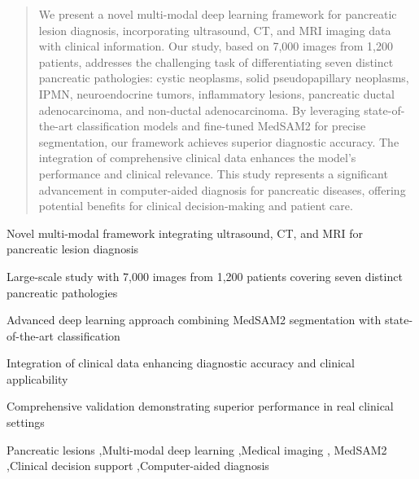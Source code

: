\documentclass[a4paper, fleqn]{cas-dc}
\begin{document}
    \begin{abstract}
        We present a novel multi-modal deep learning framework for pancreatic lesion
        diagnosis, incorporating ultrasound, CT, and MRI imaging data with
        clinical information. Our study, based on 7,000 images from 1,200
        patients, addresses the challenging task of differentiating seven distinct
        pancreatic pathologies: cystic neoplasms, solid pseudopapillary neoplasms,
        IPMN, neuroendocrine tumors, inflammatory lesions, pancreatic ductal adenocarcinoma,
        and non-ductal adenocarcinoma. By leveraging state-of-the-art classification
        models and fine-tuned MedSAM2 for precise segmentation, our framework
        achieves superior diagnostic accuracy. The integration of comprehensive clinical
        data enhances the model's performance and clinical relevance. This study
        represents a significant advancement in computer-aided diagnosis for
        pancreatic diseases, offering potential benefits for clinical decision-making
        and patient care.
    \end{abstract}


    \begin{highlights}
        \item Novel multi-modal framework integrating ultrasound, CT, and MRI for
        pancreatic lesion diagnosis \item Large-scale study with 7,000 images from
        1,200 patients covering seven distinct pancreatic pathologies \item Advanced
        deep learning approach combining MedSAM2 segmentation with state-of-the-art
        classification \item Integration of clinical data enhancing diagnostic accuracy
        and clinical applicability \item Comprehensive validation demonstrating superior
        performance in real clinical settings
    \end{highlights}

    \begin{keywords}
        Pancreatic lesions \sep Multi-modal deep learning \sep Medical imaging \sep
        MedSAM2 \sep Clinical decision support \sep Computer-aided diagnosis
    \end{keywords}
\end{document}
